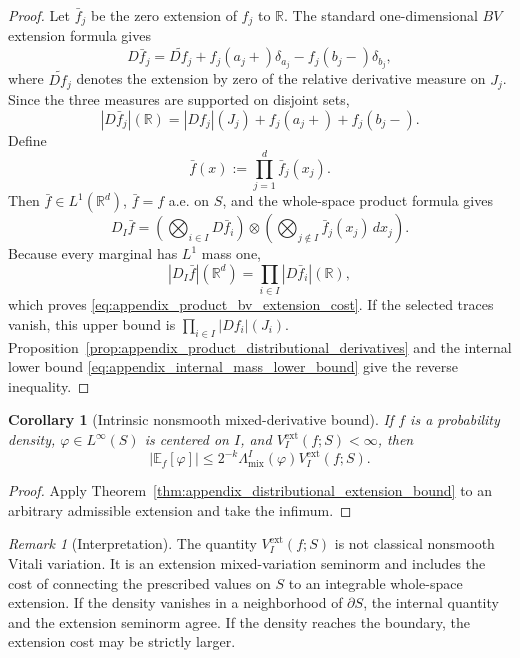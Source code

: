 \documentclass[11pt,letterpaper]{article}
\newtheorem{corollary}[theorem]{Corollary}
\theoremstyle{definition}
\theoremstyle{remark}
\newtheorem{remark}[theorem]{Remark}
\begin{document}
\begin{proof}
Let $\bar f_j$ be the zero extension of $f_j$ to $\mathbb R$. The standard
one-dimensional $BV$ extension formula \cite{AmbrosioFuscoPallara2000} gives
$$
D\bar f_j
=
\widetilde{Df_j}
+
f_j(a_j+)\delta_{a_j}
-
f_j(b_j-)\delta_{b_j},
$$
where $\widetilde{Df_j}$ denotes the extension by zero of the relative
derivative measure on $J_j$. Since the three measures are supported on
disjoint sets,
$$
|D\bar f_j|(\mathbb R)
=
|Df_j|(J_j)+f_j(a_j+)+f_j(b_j-).
$$
Define
$$
\bar f(x):=\prod_{j=1}^d\bar f_j(x_j).
$$
Then $\bar f\in L^1(\mathbb R^d)$, $\bar f=f$ a.e. on $S$, and the
whole-space product formula gives
$$
D_I\bar f
=
\left(\bigotimes_{i\in I}D\bar f_i\right)
\otimes
\left(\bigotimes_{j\notin I}\bar f_j(x_j)\,dx_j\right).
$$
Because every marginal has $L^1$ mass one,
$$
|D_I\bar f|(\mathbb R^d)
=
\prod_{i\in I}|D\bar f_i|(\mathbb R),
$$
which proves \eqref{eq:appendix_product_bv_extension_cost}. If the selected
traces vanish, this upper bound is
$\prod_{i\in I}|Df_i|(J_i)$. Proposition~\ref{prop:appendix_product_distributional_derivatives}
and the internal lower bound
\eqref{eq:appendix_internal_mass_lower_bound} give the reverse inequality.
\end{proof}

\begin{corollary}[Intrinsic nonsmooth mixed-derivative bound]
\label{cor:appendix_intrinsic_nonsmooth_mixed_bound}
If $f$ is a probability density, $\varphi\in L^\infty(S)$ is centered on $I$,
and $V_I^{\mathrm{ext}}(f;S)<\infty$, then
\begin{equation}
\label{eq:appendix_intrinsic_nonsmooth_mixed_bound}
|\mathbb E_f[\varphi]|
\le
2^{-k}\Lambda_{\mathrm{mix}}^I(\varphi)
V_I^{\mathrm{ext}}(f;S).
\end{equation}
\end{corollary}

\begin{proof}
Apply Theorem~\ref{thm:appendix_distributional_extension_bound} to an
arbitrary admissible extension and take the infimum.
\end{proof}

\begin{remark}[Interpretation]
\label{rem:appendix_extension_seminorm_interpretation}
The quantity $V_I^{\mathrm{ext}}(f;S)$ is not classical nonsmooth Vitali
variation. It is an extension mixed-variation seminorm and includes the cost
of connecting the prescribed values on $S$ to an integrable whole-space
extension. If the density vanishes in a neighborhood of $\partial S$, the internal
quantity and the extension seminorm agree. If the density reaches the boundary,
the extension cost may be strictly larger.
\end{remark}
\end{document}
